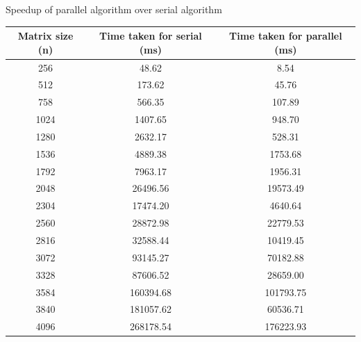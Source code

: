 \documentclass[12pt]{article}
\begin{document}
\begin{section}{Speedup of parallel algorithm over serial algorithm}
 \begin{center}
     \begin{tabular}{|c | c | c|}
         \hline
         \textbf{Matrix size (n)} & \textbf{Time taken for serial (ms)} & \textbf{Time taken for parallel (ms)} \\ [0.5ex]
         \hline
         256                      & 48.62                               & 8.54                                  \\
         \hline
         512                      & 173.62                              & 45.76                                 \\
         \hline
         758                      & 566.35                              & 107.89                                \\
         \hline
         1024                     & 1407.65                             & 948.70                                \\
         \hline
         1280                     & 2632.17                             & 528.31                                \\
         \hline
         1536                     & 4889.38                             & 1753.68                               \\
         \hline
         1792                     & 7963.17                             & 1956.31                               \\
         \hline
         2048                     & 26496.56                            & 19573.49                              \\
         \hline
         2304                     & 17474.20                            & 4640.64                               \\
         \hline
         2560                     & 28872.98                            & 22779.53                              \\
         \hline
         2816                     & 32588.44                            & 10419.45                              \\
         \hline
         3072                     & 93145.27                            & 70182.88                              \\ [1ex]
         \hline
         3328                     & 87606.52                            & 28659.00                              \\ [1ex]
         \hline
         3584                     & 160394.68                           & 101793.75                             \\ [1ex]
         \hline
         3840                     & 181057.62                           & 60536.71                              \\ [1ex]
         \hline
         4096                     & 268178.54                           & 176223.93                             \\ [1ex]
         \hline
     \end{tabular}
 \end{center}


\end{section}
\end{document}
